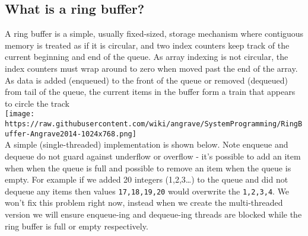\subsection{What is a ring buffer?}\label{what-is-a-ring-buffer}

A ring buffer is a simple, usually fixed-sized, storage mechanism where
contiguous memory is treated as if it is circular, and two index
counters keep track of the current beginning and end of the queue. As
array indexing is not circular, the index counters must wrap around to
zero when moved past the end of the array.\\As data is added (enqueued)
to the front of the queue or removed (dequeued) from tail of the queue,
the current items in the buffer form a train that appears to circle the
track\\\texttt{[image: https://raw.githubusercontent.com/wiki/angrave/SystemProgramming/RingBuffer-Angrave2014-1024x768.png]}\\A
simple (single-threaded) implementation is shown below. Note enqueue and
dequeue do not guard against underflow or overflow - it's possible to
add an item when when the queue is full and possible to remove an item
when the queue is empty. For example if we added 20 integers
(1,2,3\ldots{}) to the queue and did not dequeue any items then values
\texttt{17,18,19,20} would overwrite the \texttt{1,2,3,4}. We won't fix
this problem right now, instead when we create the multi-threaded
version we will ensure enqueue-ing and dequeue-ing threads are blocked
while the ring buffer is full or empty respectively.

\begin{Shaded}
\begin{Highlighting}[]
 \NormalTok{*buffer[}\NormalTok{];}
 \NormalTok{;}

  
   \NormalTok{; }
\NormalTok{\}}

 
   
   \NormalTok{;}
   
\NormalTok{\}}
\end{Highlighting}
\end{Shaded}

